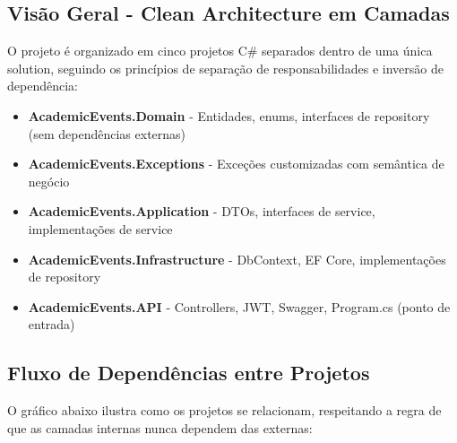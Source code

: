 \documentclass[11pt, a4paper, oneside]{article}
\begin{document}
\subsection{Visão Geral - Clean Architecture em Camadas}

O projeto é organizado em cinco projetos C\# separados dentro de uma única solution, seguindo os princípios de separação de responsabilidades e inversão de dependência:

\begin{tcolorbox}[requisito, title={Estrutura da Solution}]
\begin{itemize}[noitemsep]
  \item \textbf{AcademicEvents.Domain} - Entidades, enums, interfaces de repository (sem dependências externas)
  \item \textbf{AcademicEvents.Exceptions} - Exceções customizadas com semântica de negócio
  \item \textbf{AcademicEvents.Application} - DTOs, interfaces de service, implementações de service
  \item \textbf{AcademicEvents.Infrastructure} - DbContext, EF Core, implementações de repository
  \item \textbf{AcademicEvents.API} - Controllers, JWT, Swagger, Program.cs (ponto de entrada)
\end{itemize}
\end{tcolorbox}

\subsection{Fluxo de Dependências entre Projetos}

O gráfico abaixo ilustra como os projetos se relacionam, respeitando a regra de que as camadas internas nunca dependem das externas:

\begin{center}
\end{center}
\end{document}
